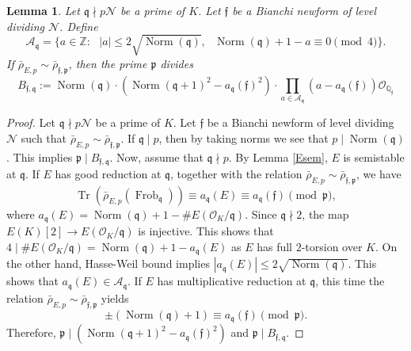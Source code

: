 \documentclass[]{article}
\newtheorem{lemma}{Lemma}
\newcommand {\mcalO}{{\mathcal{O}}}
\DeclareMathOperator{\Norm}{Norm}
\begin{document}
\begin{lemma}\label{boundingp}
Let $\mathfrak{q}\nmid p\mathcal{N}$ be a prime of $K$. Let $\mathfrak{f}$ be a Bianchi newform of level dividing $\mathcal{N}$. Define
$$
\mathcal{A}_{\mathfrak{q}}=\{a \in \mathbb{Z}:\text{ }|a| \leq 2 \sqrt{\operatorname{Norm}(\mathfrak{q})},\text{ } \operatorname{Norm}(\mathfrak{q})+1-a \equiv 0 \pmod 4\}.
$$If $\bar{\rho}_{E, p} \sim \bar{\rho}_{\mathfrak{f}, \mathfrak{p}}
$, then the prime $\mathfrak{p}$ divides 
$$
B_{\mathfrak{f}, \mathfrak{q}}:=\operatorname{Norm}(\mathfrak{q}) \cdot\left(\operatorname{Norm}(\mathfrak{q}+1)^2-a_{\mathfrak{q}}(\mathfrak{f})^2\right) \cdot \prod_{a \in \mathcal{A}_{\mathfrak{q}}}\left(a-a_{\mathfrak{q}}(\mathfrak{f})\right) \mathcal{O}_{\mathbb{Q}_{\mathfrak{f}}}
$$
\end{lemma}

\begin{proof}
Let $\mathfrak{q}\nmid p\mathcal{N}$ be a prime of $K$. Let $\mathfrak{f}$ be a Bianchi newform of level dividing $\mathcal{N}$ such that $\bar{\rho}_{E, p} \sim \bar{\rho}_{\mathfrak{f}, \mathfrak{p}}
$. If $\mathfrak{q}\mid p$, then by taking norms we see that $p\mid \Norm(\mathfrak{q})$. This implies $\mathfrak{p}\mid B_{\mathfrak{f}, \mathfrak{q}}$. Now, assume that $\mathfrak{q}\nmid p$. By Lemma \ref{Esem}, $E$ is semistable at $\mathfrak{q}$. If $E$ has good reduction at $\mathfrak{q}$, together with the relation $\bar{\rho}_{E, p} \sim \bar{\rho}_{\mathfrak{f}, \mathfrak{p}}
$, we have
$$\operatorname{Tr}\left(\bar{\rho}_{E, p}\left(\operatorname{Frob}_{\mathfrak{q}}\right)\right)\equiv a_{\mathfrak{q}}(E) \equiv a_{\mathfrak{q}}(\mathfrak{f}) \pmod {\mathfrak{p}},$$where $a_{\mathfrak{q}}(E)=\Norm(\mathfrak{q})+1-\#E\left(\mcalO_K/\mathfrak{q}\right)$. Since $\mathfrak{q}\nmid 2$, the map $E(K)[2]\to E\left(\mcalO_K/\mathfrak{q}\right)$ is injective. This shows that $4\mid \#E\left(\mcalO_K/\mathfrak{q}\right)=\Norm(\mathfrak{q})+1-a_{\mathfrak{q}}(E)$ as $E$ has full $2$-torsion over $K$. On the other hand, Hasse-Weil bound implies $|a_{\mathfrak{q}}(E)|\le 2\sqrt{\Norm(\mathfrak{q})}$. This shows that $a_{\mathfrak{q}}(E)\in \mathcal{A}_{\mathfrak{q}}$. If $E$ has multiplicative reduction at $\mathfrak{q}$, this time the relation $\bar{\rho}_{E, p} \sim \bar{\rho}_{\mathfrak{f}, \mathfrak{p}}
$ yields $$\pm (\Norm(\mathfrak{q})+1)\equiv a_{\mathfrak{q}}(\mathfrak{f}) \pmod {\mathfrak{p}}.$$Therefore, $\mathfrak{p}\mid \left(\operatorname{Norm}(\mathfrak{q}+1)^2-a_{\mathfrak{q}}(\mathfrak{f})^2\right)$ and $\mathfrak{p}\mid B_{\mathfrak{f}, \mathfrak{q}}$.
\end{proof}
\end{document}
